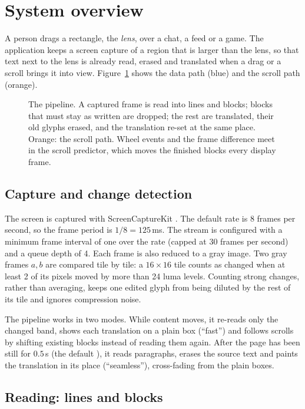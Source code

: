 \section{System overview}\label{sec:overview}

A person drags a rectangle, the \emph{lens}, over a chat, a feed or a game. The application keeps a screen capture of a
region that is larger than the lens, so that text next to the lens is already read, erased and translated when a drag or a
scroll brings it into view. Figure~\ref{fig:pipeline} shows the data path (blue) and the scroll path (orange).

\begin{figure}[t]
\centering

\caption{The pipeline. A captured frame is read into lines and blocks; blocks that must stay as written are dropped;
the rest are translated, their old glyphs erased, and the translation re-set at the same place. Orange: the scroll path.
Wheel events and the frame difference meet in the scroll predictor, which moves the finished blocks every display
frame.}\label{fig:pipeline}
\end{figure}

\subsection{Capture and change detection}

The screen is captured with ScreenCaptureKit \citep{sckdoc}. The default rate is 8 frames per second, so the frame period is
$1/8 = 125$\,ms. The stream is configured with a minimum frame interval of one over the rate (capped at 30 frames per second)
and a queue depth of 4. Each frame is also reduced to a gray image. Two gray frames $a,b$ are compared tile by tile: a
$16\times16$ tile counts as changed when at least 2 of its pixels moved by more than 24 luma levels. Counting strong
changes, rather than averaging, keeps one edited glyph from being diluted by the rest of its tile and ignores compression
noise.

The pipeline works in two modes. While content moves, it re-reads only the changed band, shows each translation on a plain box
(``fast'') and follows scrolls by shifting existing blocks instead of reading them again. After the page has been still for
$0.5$\,s (the default ), it reads paragraphs, erases the source text and paints the translation in its place
(``seamless''), cross-fading from the plain boxes.

\subsection{Reading: lines and blocks}

